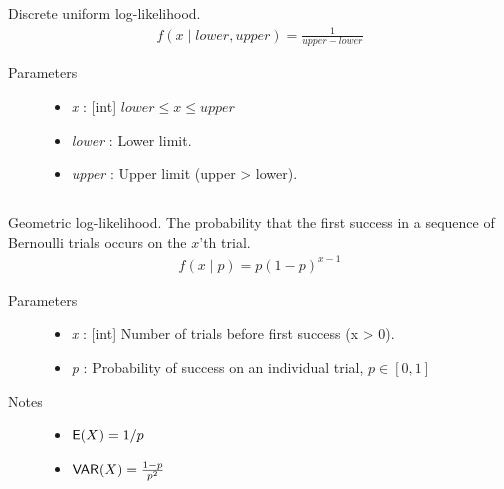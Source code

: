 \documentclass[]{jss}
\begin{document}
\subsection[discrete uniform]{}

Discrete uniform log-likelihood.
\begin{eqnarray*}
f(x \mid lower, upper) = \frac{1}{upper-lower}    
\end{eqnarray*}

\begin{description} 
\item[Parameters] \leavevmode\begin{itemize}
\item {} 
\emph{x} : {[}int{]} $lower \leq x \leq upper$

\item {} 
\emph{lower} : Lower limit.

\item {} 
\emph{upper} : Upper limit (upper \textgreater{} lower).

\end{itemize}

\end{description}

\subsection[geometric]{} 

Geometric log-likelihood. The probability that the first success in a
sequence of Bernoulli trials occurs on the $x$'th trial.
\begin{eqnarray*}
f(x \mid p) = p(1-p)^{x-1}    
\end{eqnarray*}
\begin{description}
\item[Parameters] \leavevmode\begin{itemize}
\item {} 
\emph{x} : {[}int{]} Number of trials before first success (x \textgreater{} 0).

\item {} 
\emph{p} : Probability of success on an individual trial, $p \in [0,1]$

\end{itemize}

\item[Notes] \leavevmode\begin{itemize}
\item {} 
$\mathsf{E}(X)=1/p$

\item {} 
$\mathsf{VAR}(X)=\frac{1-p}{p^2}$
\end{itemize}

\end{description}
\end{document}
